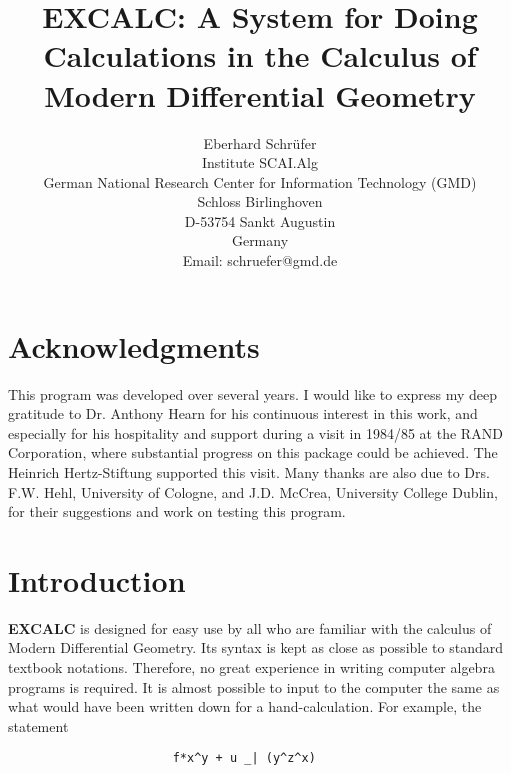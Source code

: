 \title{EXCALC: A System for Doing Calculations in the Calculus of Modern
Differential Geometry}
\author{Eberhard Schr\"{u}fer \\
Institute SCAI.Alg   \\
German National Research Center for Information Technology (GMD) \\
Schloss Birlinghoven \\
D-53754 Sankt Augustin \\
Germany       \\[0.05in]
Email: schruefer@gmd.de}

\maketitle


\section*{Acknowledgments}

This program was developed over several years. I would like to express
my deep gratitude to Dr. Anthony Hearn for his continuous interest in
this work, and especially for his hospitality and support during a
visit in 1984/85 at the RAND Corporation, where substantial progress
on this package could be achieved. The Heinrich Hertz-Stiftung
supported this visit. Many thanks are also due to Drs. F.W. Hehl,
University of Cologne, and J.D. McCrea, University College Dublin, for
their suggestions and work on testing this program.

\section{Introduction}

{\bf EXCALC} is designed for easy use by all who are familiar with the
calculus of Modern Differential Geometry.  Its syntax is kept as close
as possible to standard textbook notations.  Therefore, no great
experience in writing computer algebra programs is required.  It is
almost possible to input to the computer the same as what would have
been written down for a hand-calculation.  For example, the statement

\begin{verbatim}
                       f*x^y + u _| (y^z^x)
\end{verbatim}

